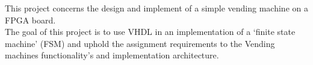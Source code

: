 This project concerns the design and implement of a simple vending machine on a FPGA board.\\   
The goal of this project is to use VHDL in an implementation of a `finite state machine' (FSM) and uphold the assignment requirements to the Vending machines functionality's and implementation architecture.
\\ 

